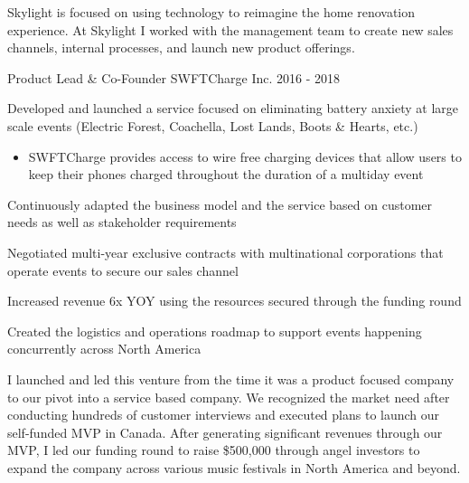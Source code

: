 \begin{cventries}
{\begin{cvitems}
    \end{cvitems}
    }
    {
    \begin{cventrysummary}
    Skylight is focused on using technology to reimagine the home renovation experience. At Skylight I worked with the management team to create new sales channels, internal processes, and launch new product offerings.
    \end{cventrysummary}
    }
  \cventry
    {Product Lead \& Co-Founder} %
    {SWFTCharge Inc.
   \textit\text{\textcolor{awesome}{(Successfully Exited)}}
    } %
    {} %
    {2016 - 2018} %
    {
    \begin{cvitems} %
        \item {Developed and launched a service focused on eliminating battery anxiety at large scale events (Electric Forest, Coachella, Lost Lands, Boots \& Hearts, etc.)
        \begin{itemize}
            \item {SWFTCharge provides access to wire free charging devices that allow users to keep their phones charged throughout the duration of a multiday event}
        \end{itemize}
        \item {Continuously adapted the business model and the service based on customer needs as well as stakeholder requirements}
        \item {Negotiated multi-year exclusive contracts with multinational corporations that operate events to secure our sales channel}
        \item {Increased revenue 6x YOY using the resources secured through the funding round}
        \item {Created the logistics and operations roadmap to support events happening concurrently across North America}}
    \end{cvitems}
    }
    {
    \begin{cventrysummary}
        I launched and led this venture from the time it was a product focused company to our pivot into a service based company. We recognized the market need after conducting hundreds of customer interviews and executed plans to launch our self-funded MVP in Canada. After generating significant revenues through our MVP, I led our funding round to raise \$500,000 through angel investors to expand the company across various music festivals in North America and beyond.
    \end{cventrysummary} 
    }
\end{cventries}
